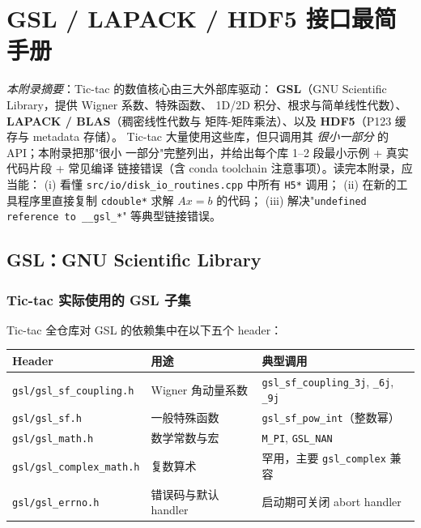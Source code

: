 
\chapter{GSL / LAPACK / HDF5 接口最简手册}
\label{app:D_libraries}

\noindent\textit{本附录摘要}：Tic-tac 的数值核心由三大外部库驱动：
\textbf{GSL}（GNU Scientific Library，提供 Wigner 系数、特殊函数、
1D/2D 积分、根求与简单线性代数）、\textbf{LAPACK / BLAS}（稠密线性代数与
矩阵-矩阵乘法）、以及 \textbf{HDF5}（P123 缓存与 metadata 存储）。
Tic-tac 大量使用这些库，但只调用其 \emph{很小一部分} 的 API；本附录把那"很小
一部分"完整列出，并给出每个库 1--2 段最小示例 + 真实代码片段 + 常见编译
链接错误（含 conda toolchain 注意事项）。读完本附录，应当能：
(i) 看懂 \texttt{src/io/disk\_io\_routines.cpp} 中所有 \texttt{H5*} 调用；
(ii) 在新的工具程序里直接复制 \texttt{cdouble*} 求解 $A x = b$ 的代码；
(iii) 解决"\texttt{undefined reference to \_\_gsl\_*}" 等典型链接错误。


\section{GSL：GNU Scientific Library}
\label{sec:appD:gsl}

\subsection{Tic-tac 实际使用的 GSL 子集}

Tic-tac 全仓库对 GSL 的依赖集中在以下五个 header：

\begin{center}
\begin{tabular}{ll p{8.5cm}}
\toprule
Header & 用途 & 典型调用 \\
\midrule
\texttt{gsl/gsl\_sf\_coupling.h}  & Wigner 角动量系数 &
  \texttt{gsl\_sf\_coupling\_3j}, \texttt{\_6j}, \texttt{\_9j} \\
\texttt{gsl/gsl\_sf.h}            & 一般特殊函数 &
  \texttt{gsl\_sf\_pow\_int}（整数幂） \\
\texttt{gsl/gsl\_math.h}          & 数学常数与宏 &
  \texttt{M\_PI}, \texttt{GSL\_NAN} \\
\texttt{gsl/gsl\_complex\_math.h} & 复数算术 & 罕用，主要 \texttt{gsl\_complex} 兼容 \\
\texttt{gsl/gsl\_errno.h}         & 错误码与默认 handler & 启动期可关闭 abort handler \\
\bottomrule
\end{tabular}
\end{center}

